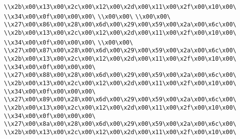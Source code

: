 \verb|\\x2b\x00\x13\x00\x2c\x00\x12\x00\x2d\x00\x11\x00\x2f\x00\x10\x00\|\newline
\verb|\\x34\x00\x0f\x00\x00\x00\|\newline
\verb|\\x00\x00\|\newline
\verb|\\x00\x00\|\newline
\verb|\\x27\x00\x86\x00\x28\x00\x6d\x00\x29\x00\x59\x00\x2a\x00\x6c\x00\|\newline
\verb|\\x2b\x00\x13\x00\x2c\x00\x12\x00\x2d\x00\x11\x00\x2f\x00\x10\x00\|\newline
\verb|\\x34\x00\x0f\x00\x00\x00\|\newline
\verb|\\x00\x00\|\newline
\verb|\\x27\x00\x87\x00\x28\x00\x6d\x00\x29\x00\x59\x00\x2a\x00\x6c\x00\|\newline
\verb|\\x2b\x00\x13\x00\x2c\x00\x12\x00\x2d\x00\x11\x00\x2f\x00\x10\x00\|\newline
\verb|\\x34\x00\x0f\x00\x00\x00\|\newline
\verb|\\x27\x00\x88\x00\x28\x00\x6d\x00\x29\x00\x59\x00\x2a\x00\x6c\x00\|\newline
\verb|\\x2b\x00\x13\x00\x2c\x00\x12\x00\x2d\x00\x11\x00\x2f\x00\x10\x00\|\newline
\verb|\\x34\x00\x0f\x00\x00\x00\|\newline
\verb|\\x27\x00\x89\x00\x28\x00\x6d\x00\x29\x00\x59\x00\x2a\x00\x6c\x00\|\newline
\verb|\\x2b\x00\x13\x00\x2c\x00\x12\x00\x2d\x00\x11\x00\x2f\x00\x10\x00\|\newline
\verb|\\x34\x00\x0f\x00\x00\x00\|\newline
\verb|\\x27\x00\x8a\x00\x28\x00\x6d\x00\x29\x00\x59\x00\x2a\x00\x6c\x00\|\newline
\verb|\\x2b\x00\x13\x00\x2c\x00\x12\x00\x2d\x00\x11\x00\x2f\x00\x10\x00\|\newline

